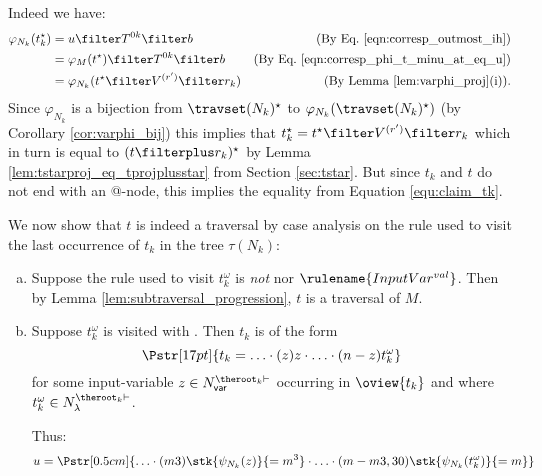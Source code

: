 \begin{itemize}[$\bullet$]
\begin{enumerate}
\begin{itemize}
        Indeed we have:
        \begin{align*}
        \varphi_{N_k}(t_k^\star) &= u \filter T^{0k}\filter b
            & \mbox{(By Eq.\ \ref{eqn:corresp_outmost_ih})} \\
         &= \varphi_{M}(t^\star) \filter T^{0k}\filter b
            & \mbox{(By Eq.\ \ref{eqn:corresp_phi_t_minu_at_eq_u})} \\
         &= \varphi_{N_k}(t^\star \filter V^{(r')} \filter r_k )
            & \mbox{(By Lemma \ref{lem:varphi_proj}(i)).}
        \end{align*}
        Since $\varphi_{N_k}$ is a bijection from  $\travset(N_k)^\star$ to $\varphi_{N_k}(\travset(N_k)^\star )$ (by Corollary \ref{cor:varphi_bij}) this implies that  $t_k^\star = t^\star \filter V^{(r')} \filter r_k$ which in turn is equal to $(t\filterplus r_k)^\star$ by Lemma \ref{lem:tstarproj_eq_tprojplusstar} from Section \ref{sec:tstar}. But since $t_k$ and $t$ do not end with an @-node, this implies the equality from Equation \ref{equ:claim_tk}.
    \smallskip

    We now show that $t$ is indeed a traversal by case analysis on the rule used to visit the last occurrence of $t_k$ in the tree $\tau(N_k)$:
    \begin{enumerate}[(a)]
    \item  Suppose the rule used to visit $t_k^\omega$ is \emph{not}  nor $\rulename{InputVar^{val}}$.
        Then by Lemma \ref{lem:subtraversal_progression}, $t$ is a traversal of $M$.

    \item Suppose $t_k^\omega$ is visited with . Then $t_k$ is of the form
        $$\Pstr[17pt]{ t_k = \ldots \cdot (z)z \cdot \ldots \cdot (n-z){t_k^\omega}}$$
        for some input-variable $z \in
        N^{\theroot_k\vdash}_{\sf var}$ occurring in
        $\oview{t_k}$ and where $t_k^\omega \in N_\lambda^{\theroot_k\vdash}$.


        Thus:
        $$u = \Pstr[0.5cm]{ \ldots \cdot (m3){\stk{\psi_{N_k}(z)}{=m^3}} \cdot
                    \ldots \cdot (m-m3,30){\stk{\psi_{N_k}(t_k^\omega)}{=m}} } $$




\end{enumerate}
\end{itemize}
\end{enumerate}
\end{itemize}
